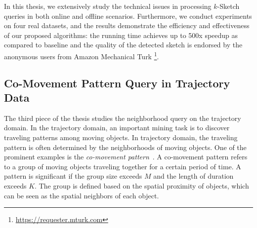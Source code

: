 In this thesis, we extensively study
the technical issues in processing $k$-Sketch queries in both online and offline scenarios.
%
%
Furthermore, we conduct experiments on four real
datasets, and the results demonstrate the efficiency and 
effectiveness of our proposed algorithms: the running time
achieves up to 500x speedup as compared to baseline and the quality of the
detected sketch is endorsed by the anonymous users
from Amazon Mechanical Turk \footnote{\url{https://requester.mturk.com}}.

\subsection{Co-Movement Pattern Query in Trajectory Data}
The third piece of the thesis studies the neighborhood
query on the trajectory domain. 
In the trajectory domain, an important
mining task is to discover traveling patterns among moving objects. In trajectory domain, the traveling pattern is often determined by the neighborhoods of moving objects. One of the prominent examples is the \emph{co-movement pattern}~\cite{li2013managing,zheng2015trajectory}.
A co-movement pattern refers to a group of moving objects traveling together for a certain period of time. A pattern is significant if the group size exceeds $M$ and the length of duration exceeds $K$. 
The group is defined based on the spatial proximity of objects, which 
can be seen as the spatial neighbors of each object.


